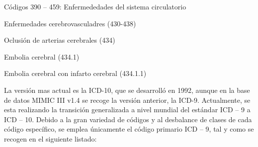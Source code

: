 \documentclass{report}
\begin{document}
\begin{myEnumerate}
\item   Códigos 390 -- 459: Enfermededades del sistema circulatorio
    \begin{myEnumerate}
    \item Enfermedades cerebrovasculadres (430-438)
        \begin{myEnumerate}
        \item Oclusión de arterias cerebrales (434)
            \begin{myEnumerate}
            \item Embolia cerebral (434.1)
                \begin{myEnumerate}
                \item Embolia cerebral con infarto cerebral (434.1.1)
                \end{myEnumerate}
            \end{myEnumerate}
         \end{myEnumerate}
      \end{myEnumerate}
\end{myEnumerate}

La versión mas actual es la ICD-10, que se desarrolló en 1992, aunque en
la base de datos MIMIC III v1.4 se recoge la versión anterior, la ICD-9.
Actualmente, se esta realizando la transición generalizada a nivel
mundial del estándar ICD -- 9 a ICD -- 10. Debido a la gran variedad de códigos y al desbalance de clases de cada
código específico, se emplea únicamente el código primario ICD -- 9, tal
y como se recogen en el siguiente listado:
\end{document}
